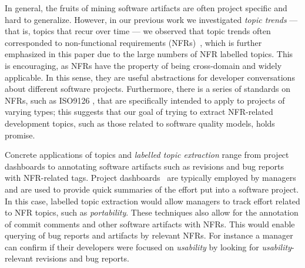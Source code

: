 \documentclass[smallextended]{svjour3}       %
\begin{document}



In general, the fruits of mining software artifacts are often project
specific and hard to generalize.  
However, in our previous work we
investigated \emph{topic trends} --- that is, topics that recur over
time --- we observed that topic trends often corresponded to
non-functional requirements (NFRs)~\cite{Hindle09ICSM}, which is
further emphasized in this paper due to the large numbers of NFR
labelled topics.  
This is encouraging, as NFRs have the property of being cross-domain
and widely applicable. 
In this sense, they are useful abstractions for developer
conversations about different software projects.  
Furthermore, there is a series of standards on NFRs, such as ISO9126 \cite{iso9126}, that are specifically intended to apply to projects of varying
types; this suggests that our goal of trying to extract NFR-related development topics, such as those related to software quality models, holds promise.

Concrete applications of topics and \emph{labelled topic extraction}
range from project dashboards to annotating software artifacts such as revisions and bug reports with
NFR-related tags.
Project dashboards~\cite{dashboard} are typically employed by managers and are used to
provide quick summaries of the effort put into a software project. In this case, 
labelled topic extraction would allow managers to track effort
related to NFR topics, such as \emph{portability}.
These techniques also allow for the annotation of commit comments
 and other software artifacts with NFRs. 
This would enable querying of bug reports and artifacts by relevant NFRs. 
For instance a manager can confirm if their developers were
focused on \emph{usability} by looking for
 \emph{usability}-relevant revisions and bug reports.
\end{document}
